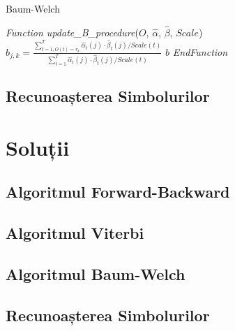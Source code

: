 \documentclass[12pt]{article}
\begin{document}
\begin{algorithm}[H]
  \caption{Baum-Welch}
  \label{alg-baum-welch-3}
   
  \begin{algorithmic}[1]
    \STATE \emph{Function update\_B\_procedure}($O$, $\hat{\alpha}$,
    $\hat{\beta}$, $Scale$)  
    \STATE $b_{j,k} = \frac{\sum_{t=1,O(t)=v_k}^{T} {\hat{\alpha}_t(j)
        \cdot \hat{\beta}_t(j) / Scale(t)}} {\sum_{t=1}^{T}
      {\hat{\alpha}_t(j) \cdot \hat{\beta}_t(j) / Scale(t)}}$
    \ENDFOR
    \ENDFOR
    \RETURN $b$ \STATE \emph{EndFunction}
  \end{algorithmic}
\end{algorithm}


\subsection{Recunoașterea Simbolurilor}
\label{sec:symbol-recognition}

\section{Soluții}
\label{sec:solutions}

\subsection{Algoritmul Forward-Backward}
\label{sec:fb-sol}

\subsection{Algoritmul Viterbi}
\label{sec:viterbi-sol}

\subsection{Algoritmul Baum-Welch}
\label{sec:baum-welch-sol}

\subsection{Recunoașterea Simbolurilor}
\label{sec:symbol-recognition-sol}
\end{document}
